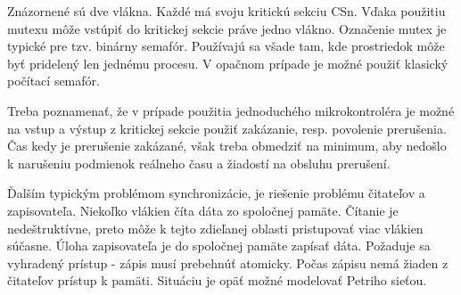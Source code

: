 Znázornené sú dve vlákna. Každé má svoju kritickú sekciu CSn. Vďaka použitiu mutexu môže vstúpiť do kritickej sekcie práve jedno vlákno. 
Označenie mutex je typické pre tzv. binárny semafór. Používajú sa všade tam, kde prostriedok môže byť pridelený len jednému procesu. V opačnom prípade je možné použiť klasický počítací semafór.

Treba poznamenať, že v prípade použitia jednoduchého mikrokontroléra je možné na vstup a výstup z kritickej sekcie použiť zakázanie, resp. povolenie prerušenia. Čas kedy je prerušenie zakázané, však treba obmedziť na minimum, aby nedošlo k narušeniu podmienok reálneho času a žiadostí na obsluhu prerušení.



\newpage
Ďalším typickým problémom synchronizácie, je riešenie problému čitateľov a zapisovateľa. Niekoľko vlákien číta dáta zo spoločnej pamäte. Čítanie je nedeštruktívne, preto môže k tejto zdieľanej oblasti pristupovať viac vlákien súčasne. Úloha zapisovateľa je do spoločnej pamäte zapísať dáta. Požaduje sa vyhradený prístup - zápis musí prebehnúť atomicky. Počas zápisu nemá žiaden z čitateľov prístup k pamäti. Situáciu je opäť možné modelovať Petriho sieťou.

